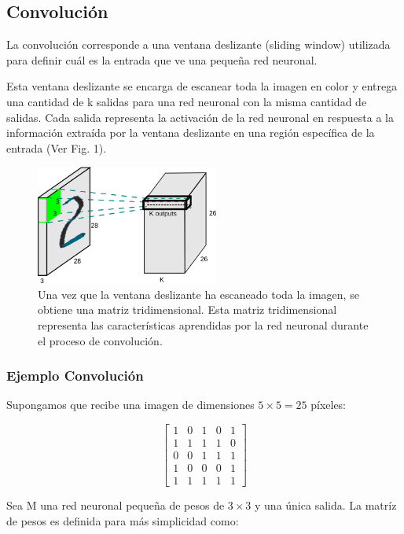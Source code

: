 \documentclass[journal]{IEEEtai}
\begin{document}
\subsection{Convolución}

La convolución corresponde a una ventana deslizante (sliding window) utilizada para definir cuál es la entrada que ve una pequeña red neuronal.

Esta ventana deslizante se encarga de escanear toda la imagen en color y entrega una cantidad de k salidas para una red neuronal con la misma cantidad de salidas. Cada salida representa la activación de la red neuronal en respuesta a la información extraída por la ventana deslizante en una región específica de la entrada (Ver Fig. 1).

\begin{figure}[H]
\centering
\includegraphics[width=6cm]{img/conv2.png}
\caption{Una vez que la ventana deslizante ha escaneado toda la imagen, se obtiene una matriz tridimensional. Esta matriz tridimensional representa las características aprendidas por la red neuronal durante el proceso de convolución.}
\label{fig: conv2}
\end{figure}

\subsubsection{Ejemplo Convolución}

Supongamos que recibe una imagen de dimensiones $5 \times 5 = 25$ píxeles:

\begin{equation}
	\begin{bmatrix}
	1 & 0 & 1 & 0 & 1 \\
	1 & 1 & 1 & 1 & 0 \\
	0 & 0 & 1 & 1 & 1 \\
	1 & 0 & 0 & 0 & 1 \\
	1 & 1 & 1 & 1 & 1 
	\end{bmatrix}
\end{equation}

\hfill \break
Sea M una red neuronal pequeña de pesos de $3 \times 3$ y una única salida. 
La matríz de pesos es definida para más simplicidad como:
\end{document}
